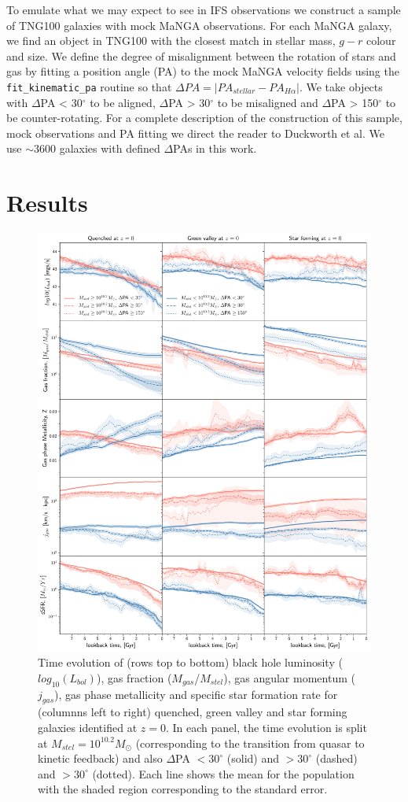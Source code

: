 \documentclass[fleqn,usenatbib]{mnras}
\begin{document}
To emulate what we may expect to see in IFS observations we construct a sample of TNG100 galaxies with mock MaNGA observations. 
For each MaNGA galaxy, we find an object in TNG100 with the closest match in stellar mass, $g-r$ colour and size. We define the degree of misalignment between the rotation of stars and gas by fitting a position angle (PA) to the mock MaNGA velocity fields using the \texttt{fit\_kinematic\_pa} routine \citep[see Appendix C of][]{krajnovic2006} so that $\Delta PA = |PA_{stellar} - PA_{H\alpha}|$. We take objects with $\Delta$PA < 30$^{\circ}$ to be aligned, $\Delta$PA > 30$^{\circ}$ to be misaligned and $\Delta$PA > 150$^{\circ}$ to be counter-rotating. For a complete description of the construction of this sample, mock observations and PA fitting we direct the reader to Duckworth et al. We use $\sim$3600 galaxies with defined $\Delta$PAs in this work. 

\section{Results} \label{sec:results}
\begin{figure}
	\includegraphics[width=0.65\linewidth]{overall_population/overall_pop_evolution_Mstel10_2.pdf}
    \caption{Time evolution of (rows top to bottom) black hole luminosity ($log_{10}(L_{bol})$), gas fraction ($M_{gas}$/$M_{stel}$), gas angular momentum ($j_{gas}$), gas phase metallicity and specific star formation rate for (columnns left to right) quenched, green valley and star forming galaxies identified at $z=0$. In each panel, the time evolution is split at $M_{stel} = 10^{10.2}M_{\odot}$ (corresponding to the transition from quasar to kinetic feedback) and also $\Delta$PA $< 30^{\circ}$ (solid) and $> 30^{\circ}$ (dashed) and  $> 30^{\circ}$ (dotted). Each line shows the mean for the population with the shaded region corresponding to the standard error.}
    \label{fig:overall_pop}
\end{figure}
\end{document}
